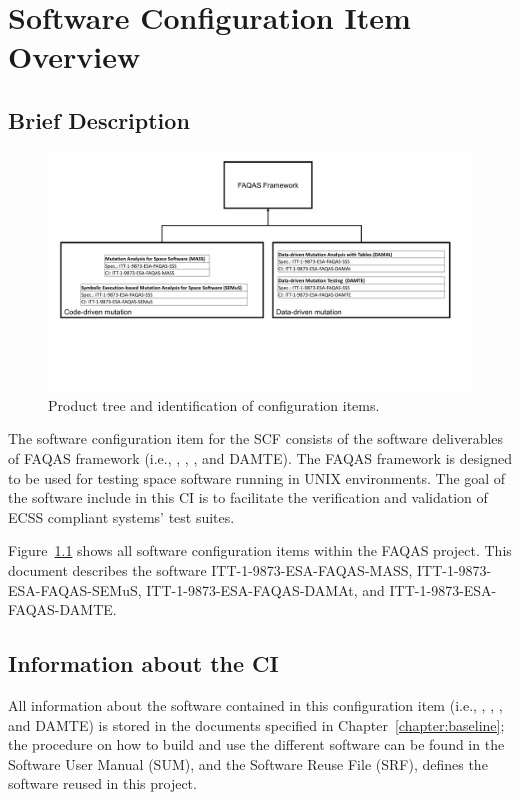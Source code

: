 
\chapter{Software Configuration Item Overview}

\section{Brief Description}

\begin{figure}[t]
  \centering
	\includegraphics[width=\textwidth]{images/CI_tree.pdf}
      \caption{Product tree and identification of configuration items.}
      \label{fig:ci:tree}
\end{figure}


The software configuration item for the SCF consists of the software deliverables of FAQAS framework (i.e., \MASS, \SEMUS, \DAMA, and DAMTE). The FAQAS framework is designed to be used for testing space software running in UNIX environments. The goal of the software include in this CI is to facilitate the verification and validation of ECSS compliant systems' test suites.

Figure~\ref{fig:ci:tree} shows all software configuration items within the FAQAS project. This document describes the software ITT-1-9873-ESA-FAQAS-MASS, ITT-1-9873-ESA-FAQAS-SEMuS, ITT-1-9873-ESA-FAQAS-DAMAt, and ITT-1-9873-ESA-FAQAS-DAMTE.

\section{Information about the CI}

All information about the software contained in this configuration item (i.e., \MASS, \SEMUS, \DAMA, and DAMTE) is stored in the documents specified in Chapter~\ref{chapter:baseline}; the procedure on how to build and use the different software can be found in the Software User Manual (SUM), and the Software Reuse File (SRF), defines the software reused in this project.

